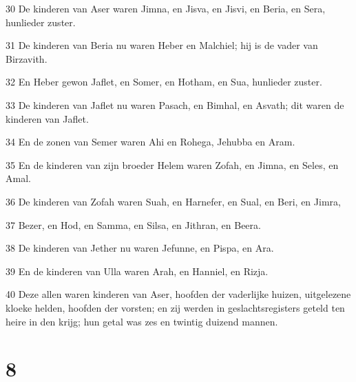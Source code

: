 \par 30 De kinderen van Aser waren Jimna, en Jisva, en Jisvi, en Beria, en Sera, hunlieder zuster.
\par 31 De kinderen van Beria nu waren Heber en Malchiel; hij is de vader van Birzavith.
\par 32 En Heber gewon Jaflet, en Somer, en Hotham, en Sua, hunlieder zuster.
\par 33 De kinderen van Jaflet nu waren Pasach, en Bimhal, en Asvath; dit waren de kinderen van Jaflet.
\par 34 En de zonen van Semer waren Ahi en Rohega, Jehubba en Aram.
\par 35 En de kinderen van zijn broeder Helem waren Zofah, en Jimna, en Seles, en Amal.
\par 36 De kinderen van Zofah waren Suah, en Harnefer, en Sual, en Beri, en Jimra,
\par 37 Bezer, en Hod, en Samma, en Silsa, en Jithran, en Beera.
\par 38 De kinderen van Jether nu waren Jefunne, en Pispa, en Ara.
\par 39 En de kinderen van Ulla waren Arah, en Hanniel, en Rizja.
\par 40 Deze allen waren kinderen van Aser, hoofden der vaderlijke huizen, uitgelezene kloeke helden, hoofden der vorsten; en zij werden in geslachtsregisters geteld ten heire in den krijg; hun getal was zes en twintig duizend mannen.

\chapter{8}

